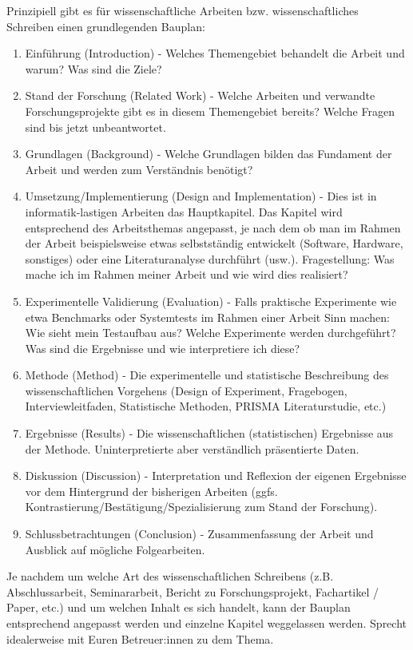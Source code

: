 Prinzipiell gibt es für wissenschaftliche Arbeiten bzw. wissenschaftliches Schreiben einen grundlegenden \glqq Bauplan\grqq{}:
\begin{enumerate}
    \item Einführung (Introduction) - Welches Themengebiet behandelt die Arbeit und warum? Was sind die Ziele?
    \item Stand der Forschung (Related Work) - Welche Arbeiten und verwandte Forschungsprojekte gibt es in diesem Themengebiet bereits? Welche Fragen sind bis jetzt unbeantwortet.
    \item Grundlagen (Background) - Welche Grundlagen bilden das Fundament der Arbeit und werden zum Verständnis benötigt?
    \item Umsetzung/Implementierung (Design and Implementation) - Dies ist in informatik-lastigen Arbeiten das Hauptkapitel. Das Kapitel wird entsprechend des Arbeitsthemas angepasst, je nach dem ob man im Rahmen der Arbeit beispielsweise etwas selbstständig entwickelt (Software, Hardware, sonstiges) oder eine Literaturanalyse durchführt (usw.). Fragestellung: Was mache ich im Rahmen meiner Arbeit und wie wird dies realisiert?
    \item Experimentelle Validierung (Evaluation) - Falls praktische Experimente wie etwa Benchmarks oder Systemtests im Rahmen einer Arbeit Sinn machen: Wie sieht mein Testaufbau aus? Welche Experimente werden durchgeführt? Was sind die Ergebnisse und wie interpretiere ich diese?
    \item Methode (Method) - Die experimentelle und statistische Beschreibung des wissenschaftlichen Vorgehens (Design of Experiment, Fragebogen, Interviewleitfaden, Statistische Methoden, PRISMA Literaturstudie, etc.)
    \item Ergebnisse (Results) - Die wissenschaftlichen (statistischen) Ergebnisse aus der Methode. Uninterpretierte aber verständlich präsentierte Daten. 
    \item Diskussion (Discussion) - Interpretation und Reflexion der eigenen Ergebnisse vor dem Hintergrund der bisherigen Arbeiten (ggfs. Kontrastierung/Bestätigung/Spezialisierung zum Stand der Forschung).
    \item Schlussbetrachtungen (Conclusion) - Zusammenfassung der Arbeit und Ausblick auf mögliche Folgearbeiten.
\end{enumerate}
Je nachdem um welche Art des wissenschaftlichen Schreibens (z.B. Abschlussarbeit, Seminararbeit, Bericht zu Forschungsprojekt, Fachartikel / Paper, etc.) und um welchen Inhalt es sich handelt, kann der \glqq Bauplan\grqq{} entsprechend angepasst werden und einzelne Kapitel weggelassen werden. Sprecht idealerweise mit Euren Betreuer:innen zu dem Thema.





